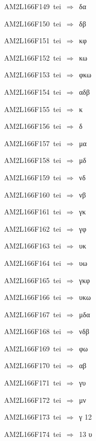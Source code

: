 {\sixrm AM2L166F149\ {\sixit tei}\ }$\Rightarrow$\ δα\par\smallskip
{\sixrm AM2L166F150\ {\sixit tei}\ }$\Rightarrow$\ δβ\par\smallskip
{\sixrm AM2L166F151\ {\sixit tei}\ }$\Rightarrow$\ κφ\par\smallskip
{\sixrm AM2L166F152\ {\sixit tei}\ }$\Rightarrow$\ κω\par\smallskip
{\sixrm AM2L166F153\ {\sixit tei}\ }$\Rightarrow$\ φκω\par\smallskip
{\sixrm AM2L166F154\ {\sixit tei}\ }$\Rightarrow$\ αδβ\par\smallskip
{\sixrm AM2L166F155\ {\sixit tei}\ }$\Rightarrow$\ κ\par\smallskip
{\sixrm AM2L166F156\ {\sixit tei}\ }$\Rightarrow$\ δ\par\smallskip
{\sixrm AM2L166F157\ {\sixit tei}\ }$\Rightarrow$\ μα\par\smallskip
{\sixrm AM2L166F158\ {\sixit tei}\ }$\Rightarrow$\ μδ\par\smallskip
{\sixrm AM2L166F159\ {\sixit tei}\ }$\Rightarrow$\ νδ\par\smallskip
{\sixrm AM2L166F160\ {\sixit tei}\ }$\Rightarrow$\ νβ\par\smallskip
{\sixrm AM2L166F161\ {\sixit tei}\ }$\Rightarrow$\ γκ\par\smallskip
{\sixrm AM2L166F162\ {\sixit tei}\ }$\Rightarrow$\ γφ\par\smallskip
{\sixrm AM2L166F163\ {\sixit tei}\ }$\Rightarrow$\ υκ\par\smallskip
{\sixrm AM2L166F164\ {\sixit tei}\ }$\Rightarrow$\ υω\par\smallskip
{\sixrm AM2L166F165\ {\sixit tei}\ }$\Rightarrow$\ γκφ\par\smallskip
{\sixrm AM2L166F166\ {\sixit tei}\ }$\Rightarrow$\ υκω\par\smallskip
{\sixrm AM2L166F167\ {\sixit tei}\ }$\Rightarrow$\ μδα\par\smallskip
{\sixrm AM2L166F168\ {\sixit tei}\ }$\Rightarrow$\ νδβ\par\smallskip
{\sixrm AM2L166F169\ {\sixit tei}\ }$\Rightarrow$\ φω\par\smallskip
{\sixrm AM2L166F170\ {\sixit tei}\ }$\Rightarrow$\ αβ\par\smallskip
{\sixrm AM2L166F171\ {\sixit tei}\ }$\Rightarrow$\ γυ\par\smallskip
{\sixrm AM2L166F172\ {\sixit tei}\ }$\Rightarrow$\ μν\par\smallskip
{\sixrm AM2L166F173\ {\sixit tei}\ }$\Rightarrow$\ γ  12\par\smallskip
{\sixrm AM2L166F174\ {\sixit tei}\ }$\Rightarrow$\ 13  υ\par\smallskip

